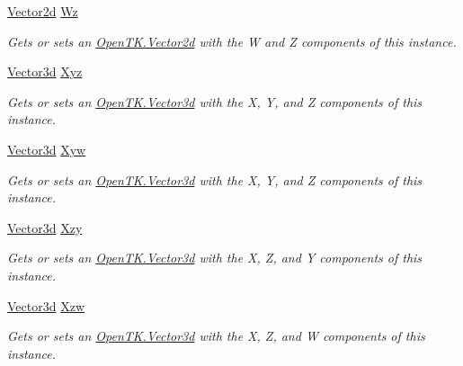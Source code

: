 \begin{DoxyCompactItemize}
\hyperlink{struct_open_t_k_1_1_vector2d}{Vector2d} \hyperlink{struct_open_t_k_1_1_vector4d_a9ba4c7347663f24f20fd565daaa36066}{Wz}
\begin{DoxyCompactList}\small\item\em Gets or sets an \hyperlink{struct_open_t_k_1_1_vector2d}{Open\-T\-K.\-Vector2d} with the W and Z components of this instance. \end{DoxyCompactList}\item 
\hyperlink{struct_open_t_k_1_1_vector3d}{Vector3d} \hyperlink{struct_open_t_k_1_1_vector4d_ac07b2f14a4b949711001d3e67ff37991}{Xyz}
\begin{DoxyCompactList}\small\item\em Gets or sets an \hyperlink{struct_open_t_k_1_1_vector3d}{Open\-T\-K.\-Vector3d} with the X, Y, and Z components of this instance. \end{DoxyCompactList}\item 
\hyperlink{struct_open_t_k_1_1_vector3d}{Vector3d} \hyperlink{struct_open_t_k_1_1_vector4d_aa5103a7c073c7305e801ee8510a753d4}{Xyw}
\begin{DoxyCompactList}\small\item\em Gets or sets an \hyperlink{struct_open_t_k_1_1_vector3d}{Open\-T\-K.\-Vector3d} with the X, Y, and Z components of this instance. \end{DoxyCompactList}\item 
\hyperlink{struct_open_t_k_1_1_vector3d}{Vector3d} \hyperlink{struct_open_t_k_1_1_vector4d_ae97427057c354728905f292554a2816c}{Xzy}
\begin{DoxyCompactList}\small\item\em Gets or sets an \hyperlink{struct_open_t_k_1_1_vector3d}{Open\-T\-K.\-Vector3d} with the X, Z, and Y components of this instance. \end{DoxyCompactList}\item 
\hyperlink{struct_open_t_k_1_1_vector3d}{Vector3d} \hyperlink{struct_open_t_k_1_1_vector4d_a5a5310d719755ec2771ca67aa51ed7e6}{Xzw}
\begin{DoxyCompactList}\small\item\em Gets or sets an \hyperlink{struct_open_t_k_1_1_vector3d}{Open\-T\-K.\-Vector3d} with the X, Z, and W components of this instance. \end{DoxyCompactList}\item 

\end{DoxyCompactItemize}
